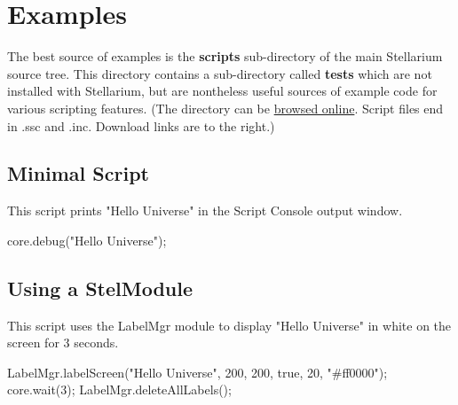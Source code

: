 \section{Examples}
\label{sec:scripting:examples}
The best source of examples is the \textbf{scripts} sub-directory of the main Stellarium source tree. This directory contains a sub-directory called \textbf{tests} which are not installed with Stellarium, but are nontheless useful sources of example code for various scripting features. (The directory can be \href{http://bazaar.launchpad.net/~stellarium/stellarium/trunk/files/head:/scripts/}{browsed online}. Script files end in .ssc and .inc. Download links are to the right.)

\subsection{Minimal Script}
\label{sec:scripting:MinimalScript}
This script prints "Hello Universe" in the Script Console output window.
\begin{script}
core.debug("Hello Universe");
\end{script}

\subsection{Using a StelModule}
\label{sec:scripting:UsingStelModule}
This script uses the LabelMgr module to display "Hello Universe" in white on the screen for 3 seconds.
\begin{script}
LabelMgr.labelScreen("Hello Universe", 200, 200, true, 20, "#ff0000");
core.wait(3);
LabelMgr.deleteAllLabels();
\end{script}

